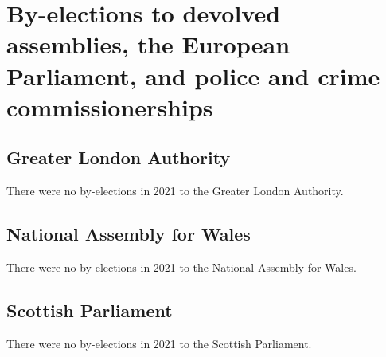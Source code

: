 \documentclass[a4paper,openany]{book}
\begin{document}
\chapter{By-elections to devolved assemblies, the European Parliament, and police and crime commissionerships}

\section{Greater London Authority}

There were no by-elections in 2021 to the Greater London Authority.


\section{National Assembly for Wales}

There were no by-elections in 2021 to the National Assembly for Wales.


\section{Scottish Parliament}

There were no by-elections in 2021 to the Scottish Parliament.

%
%
%
\end{document}
